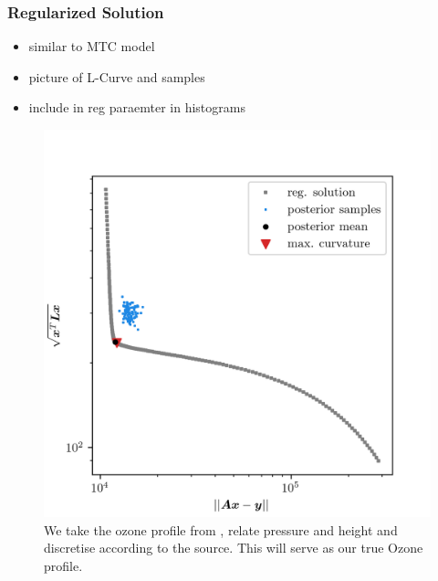 \subsubsection{Regularized Solution}
\begin{itemize}
	\item similar to MTC model
	\item picture of L-Curve and samples 
	\item include in reg paraemter in histograms
\end{itemize}
\begin{figure}[ht!]
	\centering
	\includegraphics{LCurvePhD.png}
	\caption{We take the ozone profile from \cite{}, relate pressure and height and discretise according to the source.
		This will serve as our true Ozone profile.}
	\label{fig:LCurve}
\end{figure}

